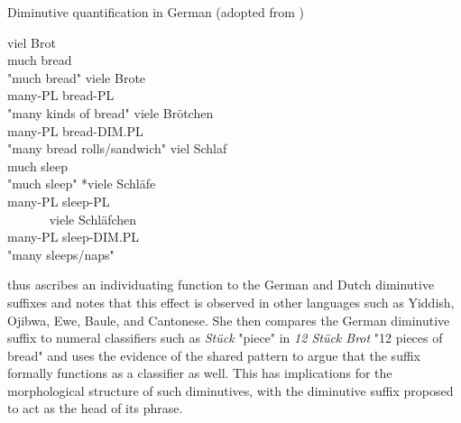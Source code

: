 \begin{exe}
\ex \label{ex:mass-to-count-to-kind-to-item} 
Diminutive quantification in German (adopted from \citeauthor{Wiltschko+2006} \citeyear{Wiltschko+2006})
\begin{multicols}{2}
\begin{xlist}
\ex \gll
viel Brot\\
much bread\\
\trans "much bread"
\ex \gll
viele Brote\\
many-PL bread-PL\\
\trans "many kinds of bread"
\ex \gll
viele Brötchen\\
many-PL bread-DIM.PL\\
\trans "many bread rolls/sandwich"
\columnbreak
\ex \gll
viel Schlaf\\
much sleep\\
\trans "much sleep"
\ex \gll
*viele Schläfe\\
many-PL sleep-PL\\
\trans ~~~~~~
\ex \gll
viele Schläfchen\\
many-PL sleep-DIM.PL\\
\trans "many sleeps/naps"
\end{xlist}
\end{multicols}
\end{exe}

\citeauthor{Wiltschko+2006} thus ascribes an individuating function to the German and Dutch diminutive suffixes and notes that this effect is observed in other languages such as Yiddish, Ojibwa, Ewe, Baule, and Cantonese. She then compares the German diminutive suffix to numeral classifiers such as \textit{Stück} "piece" in \textit{12 Stück Brot} "12 pieces of bread" and uses the evidence of the shared pattern to argue that the suffix formally functions as a classifier as well. This has implications for the morphological structure of such diminutives, with the diminutive suffix proposed to act as the head of its phrase.

